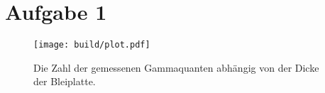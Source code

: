 




    
    \section*{Aufgabe 1}
    \begin{figure}
        \centering
        \texttt{[image: build/plot.pdf]}
        \caption{Die Zahl der gemessenen Gammaquanten abhängig 
        von der Dicke der Bleiplatte.}
    \end{figure}

